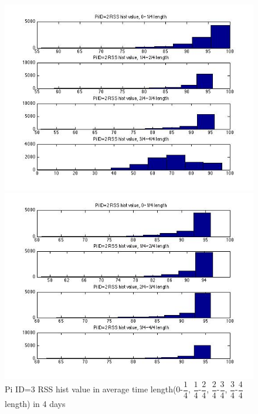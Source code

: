 \documentclass[10pt,conference]{IEEEtran}
\begin{document}
\begin{figure}[htbp]
\begin{minipage}[t]{0.2\textwidth}
	\includegraphics[scale=0.2]{time2-7}
\end{minipage}
\begin{minipage}[t]{0.2\textwidth}
	\centering
	\includegraphics[scale=0.2]{time2-8}
\end{minipage}
\caption{Pi ID=3 RSS hist value in average time length(0-$\dfrac{1}{4}$, $\dfrac{1}{4}$-$\dfrac{2}{4}$, $\dfrac{2}{4}$-$\dfrac{3}{4}$, $\dfrac{3}{4}$-$\dfrac{4}{4}$ length) in 4 days}\label{hist5}
\end{figure}

\end{document}
